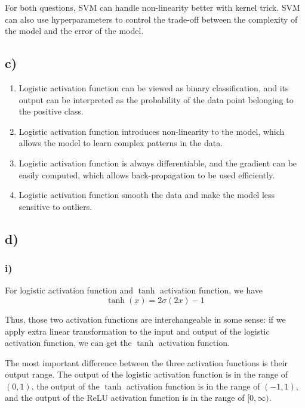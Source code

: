 \documentclass[a4paper,12pt]{article}
\begin{document}
For both questions, SVM can handle non-linearity better with kernel trick. SVM can also use hyperparameters to control the trade-off between the complexity of the model and the error of the model.

\subsection*{c)}

\begin{enumerate}
	\item Logistic activation function can be viewed as binary classification, and its output can be interpreted as the probability of the data point belonging to the positive class.
	\item Logistic activation function introduces non-linearity to the model, which allows the model to learn complex patterns in the data.
	\item Logistic activation function is always differentiable, and the gradient can be easily computed, which allows back-propagation to be used efficiently.
	\item Logistic activation function smooth the data and make the model less sensitive to outliers.
\end{enumerate}

\subsection*{d)}

\subsubsection*{i)}

For logistic activation function and $\tanh$ activation function, we have
\begin{equation*}
	\tanh(x) = 2 \sigma(2x) - 1
\end{equation*}

Thus, those two activation functions are interchangeable in some sense: if we apply extra linear transformation to the input and output of the logistic activation function, we can get the $\tanh$ activation function.

The most important difference between the three activation functions is their output range. The output of the logistic activation function is in the range of $(0, 1)$, the output of the $\tanh$ activation function is in the range of $(-1, 1)$, and the output of the ReLU activation function is in the range of $[0, \infty)$.
\end{document}
